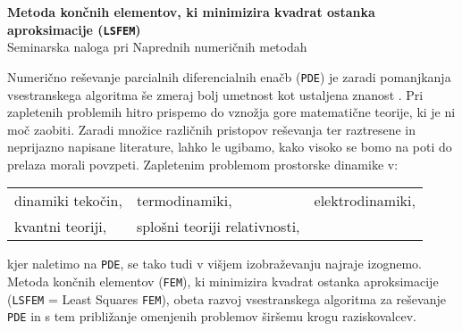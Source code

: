 \begin{center}
	\textbf{\LARGE{Metoda končnih elementov, ki minimizira kvadrat ostanka aproksimacije (\texttt{LSFEM})}}\\[0.25cm]
	\large{Seminarska naloga pri Naprednih numeričnih metodah}\\[0.7cm]
\end{center}

Numerično reševanje parcialnih diferencialnih enačb (\texttt{PDE}) je zaradi pomanjkanja vsestranskega algoritma še zmeraj bolj umetnost kot ustaljena znanost \cite{JiangB-LSFEM}. Pri zapletenih problemih hitro prispemo do vznožja gore matematične teorije, ki je ni moč zaobiti. Zaradi množice različnih pristopov reševanja ter raztresene in neprijazno napisane literature, lahko le ugibamo, kako visoko se bomo na poti do prelaza morali povzpeti. Zapletenim problemom prostorske dinamike v:
\begin{center}
	\begin{tabular}[h]{lll}
		\tabitem dinamiki tekočin,\hspace{1cm}	&	\tabitem termodinamiki,\hspace{2.5cm}	&	\tabitem elektrodinamiki,\\
		\tabitem kvantni teoriji,	&	\tabitem splošni teoriji relativnosti,&	\\
	\end{tabular}
\end{center}
kjer naletimo na \texttt{PDE}, se tako tudi v višjem izobraževanju najraje izognemo. Metoda končnih elementov (\texttt{FEM}), ki minimizira kvadrat ostanka aproksimacije (\texttt{LSFEM} = Least Squares \texttt{FEM}), obeta razvoj vsestranskega algoritma za reševanje \texttt{PDE} in s tem približanje omenjenih problemov širšemu krogu raziskovalcev.